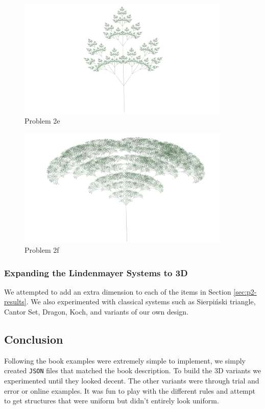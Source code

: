 \begin{figure}[H]
    \centering
    \noindent\includegraphics[width=0.90\textwidth]{figures/L-systems/e.png}
    \caption{Problem 2e}\label{fig:prob2e}
\end{figure}

\begin{figure}[H]
    \centering
    \includegraphics[width=0.90\textwidth]{figures/L-systems/f.png}
    \caption{Problem 2f}\label{fig:prob2f}
\end{figure}

\subsubsection{Expanding the Lindenmayer Systems to 3D}
We attempted to add an extra dimension to each of the items in Section
\ref{sec:p2-results}. We also experimented with classical systems such as
Sierpiński triangle, Cantor Set, Dragon, Koch, and variants of our own design.



\subsection{Conclusion}
Following the book examples were extremely simple to implement, we simply
created \texttt{JSON} files that matched the book description. To build the 3D
variants we experimented until they looked decent. The other variants were
through trial and error or online examples. It was fun to play with the
different rules and attempt to get structures that were uniform but didn't
entirely look uniform.
